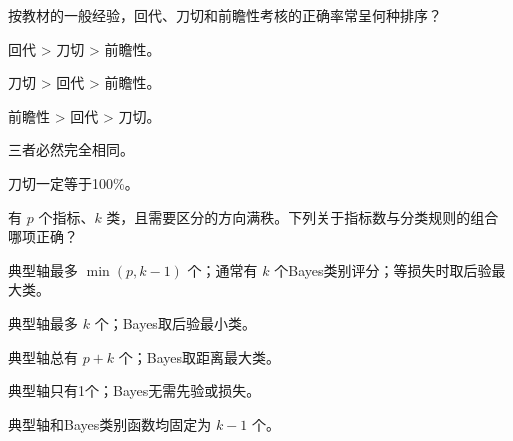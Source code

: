 \par\addvspace{6pt}\noindent\begin{minipage}{\linewidth}


按教材的一般经验，回代、刀切和前瞻性考核的正确率常呈何种排序？


\begin{choices}

\item 回代 \textgreater{} 刀切 \textgreater{} 前瞻性。

\item 刀切 \textgreater{} 回代 \textgreater{} 前瞻性。

\item 前瞻性 \textgreater{} 回代 \textgreater{} 刀切。

\item 三者必然完全相同。

\item 刀切一定等于100\%。

\end{choices}

\end{minipage}\par\vspace{4pt}

\par\addvspace{6pt}\noindent\begin{minipage}{\linewidth}


有 \(p\) 个指标、\(k\) 类，且需要区分的方向满秩。下列关于指标数与分类规则的组合哪项正确？


\begin{choices}

\item 典型轴最多 \(\min(p,k-1)\) 个；通常有 \(k\) 个Bayes类别评分；等损失时取后验最大类。

\item 典型轴最多 \(k\) 个；Bayes取后验最小类。

\item 典型轴总有 \(p+k\) 个；Bayes取距离最大类。

\item 典型轴只有1个；Bayes无需先验或损失。

\item 典型轴和Bayes类别函数均固定为 \(k-1\) 个。

\end{choices}

\end{minipage}\par\vspace{4pt}

